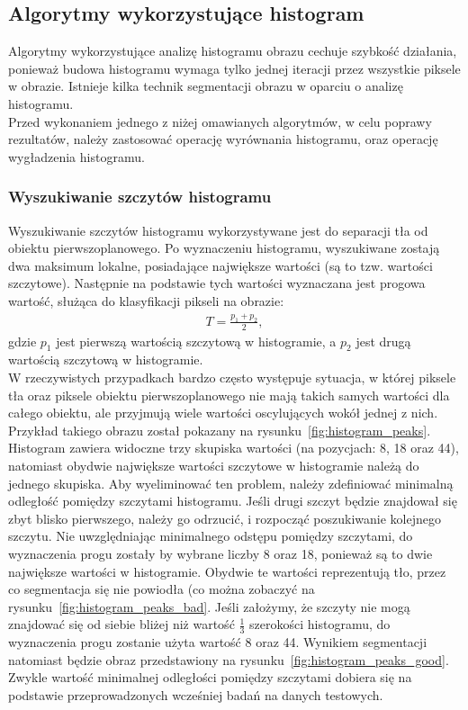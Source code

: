 \subsection{Algorytmy wykorzystujące histogram}
Algorytmy wykorzystujące analizę histogramu obrazu cechuje szybkość działania, ponieważ budowa histogramu wymaga tylko jednej iteracji przez wszystkie piksele w obrazie. Istnieje kilka technik segmentacji obrazu w oparciu o analizę histogramu. \\
Przed wykonaniem jednego z niżej omawianych algorytmów, w celu poprawy rezultatów, należy zastosować operację wyrównania histogramu, oraz operację wygładzenia histogramu.

\subsubsection{Wyszukiwanie szczytów histogramu}
Wyszukiwanie szczytów histogramu wykorzystywane jest do separacji tła od obiektu pierwszoplanowego. Po wyznaczeniu histogramu, wyszukiwane zostają dwa maksimum lokalne, posiadające największe wartości (są to tzw. wartości szczytowe). Następnie na podstawie tych wartości wyznaczana jest progowa wartość, służąca do klasyfikacji pikseli na obrazie:
\begin{gather*}
  T = \frac{p_1 + p_2}{2},
\end{gather*}
gdzie $p_1$ jest pierwszą wartością szczytową w histogramie, a $p_2$ jest drugą wartością szczytową w histogramie. \\
W rzeczywistych przypadkach bardzo często występuje sytuacja, w której piksele tła oraz piksele obiektu pierwszoplanowego nie mają takich samych wartości dla całego obiektu, ale przyjmują wiele wartości oscylujących wokół jednej z nich. Przykład takiego obrazu został pokazany na rysunku~\ref{fig:histogram_peaks}. Histogram zawiera widoczne trzy skupiska wartości (na pozycjach: 8, 18 oraz 44), natomiast obydwie największe wartości szczytowe w histogramie należą do jednego skupiska. Aby wyeliminować ten problem, należy zdefiniować minimalną odległość pomiędzy szczytami histogramu. Jeśli drugi szczyt będzie znajdował się zbyt blisko pierwszego, należy go odrzucić, i rozpocząć poszukiwanie kolejnego szczytu. Nie uwzględniając minimalnego odstępu pomiędzy szczytami, do wyznaczenia progu zostały by wybrane liczby 8 oraz 18, ponieważ są to dwie największe wartości w histogramie. Obydwie te wartości reprezentują tło, przez co segmentacja się nie powiodła (co można zobaczyć na rysunku~\ref{fig:histogram_peaks_bad}. Jeśli założymy, że szczyty nie mogą znajdować się od siebie bliżej niż wartość $\frac{1}{3}$ szerokości histogramu, do wyznaczenia progu zostanie użyta wartość 8 oraz 44. Wynikiem segmentacji natomiast będzie obraz przedstawiony na rysunku~\ref{fig:histogram_peaks_good}. Zwykle wartość minimalnej odległości pomiędzy szczytami dobiera się na podstawie przeprowadzonych wcześniej badań na danych testowych.
